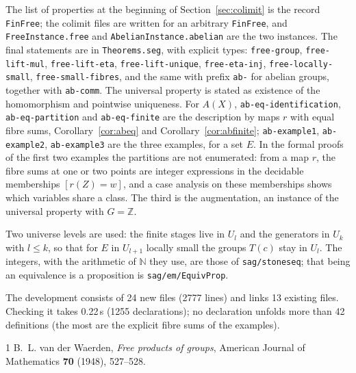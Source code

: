 \documentclass[11pt]{amsart}
\theoremstyle{definition}
\theoremstyle{remark}
\newcommand{\code}[1]{\texttt{#1}}
\newcommand{\Z}{\mathbb{Z}}
\begin{document}
\noindent The list of properties at the beginning of
Section~\ref{sec:colimit} is the record \code{FinFree}; the colimit files
are written for an arbitrary \code{FinFree}, and \code{FreeInstance.free}
and \code{AbelianInstance.abelian} are the two instances. The final
statements are in \code{Theorems.seg}, with explicit types:
\code{free-group}, \code{free-lift-mul}, \code{free-lift-eta},
\code{free-lift-unique}, \code{free-eta-inj}, \code{free-locally-small},
\code{free-small-fibres}, and the same with prefix \code{ab-} for abelian
groups, together with \code{ab-comm}. The universal property is stated as
existence of the homomorphism and pointwise uniqueness.
For $A(X)$, \code{ab-eq-identification}, \code{ab-eq-partition} and
\code{ab-eq-finite} are the description by maps $r$ with equal fibre sums,
Corollary~\ref{cor:abeq} and Corollary~\ref{cor:abfinite};
\code{ab-example1}, \code{ab-example2}, \code{ab-example3} are the
three examples, for a set $E$. In the formal proofs of the first two
examples the partitions are not enumerated: from a map $r$, the fibre sums
at one or two points are integer expressions in the decidable memberships
$[r(Z)=w]$, and a case analysis on these memberships shows which variables
share a class. The third is the augmentation, an instance of the universal
property with $G=\Z$.

Two universe levels are used: the finite stages live in $U_l$ and the
generators in $U_k$ with $l\le k$, so that for $E$ in $U_{l+1}$ locally
small the groups $T(c)$ stay in $U_l$. The integers, with the arithmetic of $\mathbb N$ they
use, are those of \code{sag/stoneseq}; that being an equivalence
is a proposition is \code{sag/em/EquivProp}.

The development consists of 24 new files (2777 lines) and links 13
existing files. Checking it takes 0.22\,s (1255 declarations); no
declaration unfolds more than 42 definitions (the most are the explicit
fibre sums of the examples).

\begin{thebibliography}{1}
 B.~L. van der Waerden, \emph{Free products of groups},
American Journal of Mathematics \textbf{70} (1948), 527--528.
\end{thebibliography}
\end{document}
